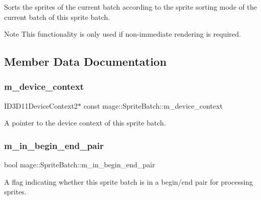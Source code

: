 Sorts the sprites of the current batch according to the sprite sorting mode of the current batch of this sprite batch.

\begin{DoxyNote}{Note}
This functionality is only used if non-\/immediate rendering is required. 
\end{DoxyNote}


\subsection{Member Data Documentation}
\hypertarget{classmage_1_1_sprite_batch_a95d4de79a01ffe5603a2cfa2eddd53b7}{}\label{classmage_1_1_sprite_batch_a95d4de79a01ffe5603a2cfa2eddd53b7} 
\subsubsection{\texorpdfstring{m\+\_\+device\+\_\+context}{m\_device\_context}}
{\footnotesize\ttfamily I\+D3\+D11\+Device\+Context2$\ast$ const mage\+::\+Sprite\+Batch\+::m\+\_\+device\+\_\+context\hspace{0.3cm}{\ttfamily [private]}}

A pointer to the device context of this sprite batch. \hypertarget{classmage_1_1_sprite_batch_a2f4e56ee07ef37a2906c552b0ea78403}{}\label{classmage_1_1_sprite_batch_a2f4e56ee07ef37a2906c552b0ea78403} 
\subsubsection{\texorpdfstring{m\+\_\+in\+\_\+begin\+\_\+end\+\_\+pair}{m\_in\_begin\_end\_pair}}
{\footnotesize\ttfamily bool mage\+::\+Sprite\+Batch\+::m\+\_\+in\+\_\+begin\+\_\+end\+\_\+pair\hspace{0.3cm}{\ttfamily [private]}}

A flag indicating whether this sprite batch is in a begin/end pair for processing sprites. \hypertarget{classmage_1_1_sprite_batch_a8e333637fa0af0858fd3a3efa1e59c3a}{}\label{classmage_1_1_sprite_batch_a8e333637fa0af0858fd3a3efa1e59c3a} 
